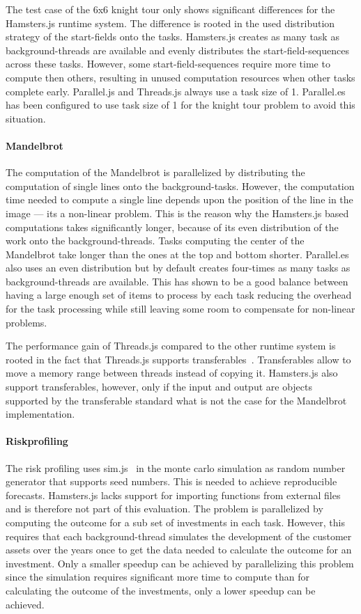 The test case of the 6x6 knight tour only shows significant differences for the Hamsters.js runtime system. The difference is rooted in the used distribution strategy of the start-fields onto the tasks. Hamsters.js creates as many task as background-threads are available and evenly distributes the start-field-sequences across these tasks. However, some start-field-sequences require more time to compute then others, resulting in unused computation resources when other tasks complete early. Parallel.js and Threads.js always use a task size of 1. Parallel.es has been configured to use task size of 1 for the knight tour problem to avoid this situation.

\paragraph{Mandelbrot}
The computation of the Mandelbrot is parallelized by distributing the computation of single lines onto the background-tasks. However, the computation time needed to compute a single line depends upon the position of the line in the image --- its a non-linear problem. This is the reason why the Hamsters.js based computations takes significantly longer, because of its even distribution of the work onto the background-threads. Tasks computing the center of the Mandelbrot take longer than the ones at the top and bottom shorter. Parallel.es also uses an even distribution but by default creates four-times as many tasks as background-threads are available. This has shown to be a good balance between having a large enough set of items to process by each task reducing the overhead for the task processing while still leaving some room to compensate for non-linear problems. 

The performance gain of Threads.js compared to the other runtime system is rooted in the fact that Threads.js supports transferables~\cite[Section 2.7.4]{w3cHtml5}. Transferables allow to move a memory range between threads instead of copying it. Hamsters.js also support transferables, however, only if the input and output are objects supported by the transferable standard what is not the case for the Mandelbrot implementation.

\paragraph{Riskprofiling}
The risk profiling uses sim.js~\cite{simjs} in the monte carlo simulation as random number generator that supports seed numbers. This is needed to achieve reproducible forecasts. Hamsters.js lacks support for importing functions from external files and is therefore not part of this evaluation. The problem is parallelized by computing the outcome for a sub set of investments in each task. However, this requires that each background-thread simulates the development of the customer assets over the years once to get the data needed to calculate the outcome for an investment. Only a smaller speedup can be achieved by parallelizing this problem since the simulation requires significant more time to compute than for calculating the outcome of the investments, only a lower speedup can be achieved. 

